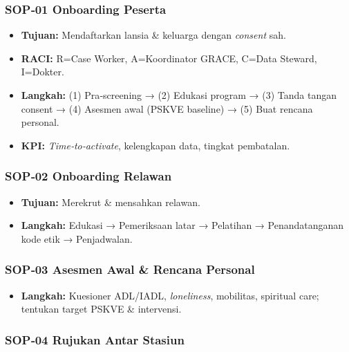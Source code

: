 \documentclass[
  letterpaper,
  DIV=11,
  numbers=noendperiod]{scrartcl}
\providecommand{\tightlist}{%
  \setlength{\itemsep}{0pt}\setlength{\parskip}{0pt}}
\begin{document}
\subsubsection{SOP‑01 Onboarding
Peserta}\label{sop01-onboarding-peserta}

\begin{itemize}
\tightlist
\item
  \textbf{Tujuan:} Mendaftarkan lansia \& keluarga dengan \emph{consent}
  sah.
\item
  \textbf{RACI:} R=Case Worker, A=Koordinator GRACE, C=Data Steward,
  I=Dokter.
\item
  \textbf{Langkah:} (1) Pra‑screening → (2) Edukasi program → (3) Tanda
  tangan consent → (4) Asesmen awal (PSKVE baseline) → (5) Buat rencana
  personal.
\item
  \textbf{KPI:} \emph{Time‑to‑activate}, kelengkapan data, tingkat
  pembatalan.
\end{itemize}

\subsubsection{SOP‑02 Onboarding
Relawan}\label{sop02-onboarding-relawan}

\begin{itemize}
\tightlist
\item
  \textbf{Tujuan:} Merekrut \& mensahkan relawan.
\item
  \textbf{Langkah:} Edukasi → Pemeriksaan latar → Pelatihan →
  Penandatanganan kode etik → Penjadwalan.
\end{itemize}

\subsubsection{SOP‑03 Asesmen Awal \& Rencana
Personal}\label{sop03-asesmen-awal-rencana-personal}

\begin{itemize}
\tightlist
\item
  \textbf{Langkah:} Kuesioner ADL/IADL, \emph{loneliness}, mobilitas,
  spiritual care; tentukan target PSKVE \& intervensi.
\end{itemize}

\subsubsection{SOP‑04 Rujukan Antar
Stasiun}\label{sop04-rujukan-antar-stasiun}
\end{document}
